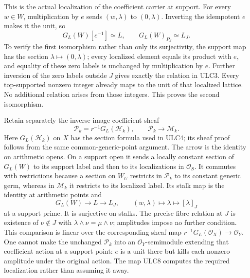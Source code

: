 \documentclass[11pt,a4paper]{article}
\theoremstyle{definition}\newtheorem{definition}[theorem]{Definition}
\begin{document}
This is the actual localization of the coefficient carrier at support.
For every $w\in W$, multiplication by $e$ sends $(w,\lambda)$ to
$(0,\lambda)$. Inverting the idempotent $e$ makes it the unit, so
\begin{equation}\tag{ULC6}
 G_L(W)[e^{-1}]\simeq L,
 \qquad G_L(W)_{P_J}\simeq L_J.
\end{equation}
To verify the first isomorphism rather than only its surjectivity,
the support map has the section $\lambda\mapsto(0,\lambda)$;
every localized element equals its product with $e$, and equality
of these zero labels is unchanged by multiplication by $e$.
Further inversion of the zero labels outside $J$ gives exactly
the relation in ULC3. Every top-supported nonzero integer already
maps to the unit of that localized lattice. No additional relation
arises from those integers. This proves the second isomorphism.

Retain separately the inverse-image coefficient sheaf
\begin{equation}\tag{ULC7}
 \mathcal P_k=r^{-1}G_L(\mathcal H_k),\qquad
 \mathcal P_k\longrightarrow\mathcal M_k.
\end{equation}
Here $G_L(\mathcal H_k)$ on $X$ has the section formula used in
ULC4; its sheaf proof follows from the same common-generic-point
argument. The arrow is the identity on arithmetic opens. On a support
open it sends a locally constant section of $G_L(W)$ to its support
label and then to its localizations in $\mathcal O_S$.
It commutes with restrictions because a section on $W_U$ restricts
in $\mathcal P_k$ to its constant generic germ, whereas in
$\mathcal M_k$ it restricts to its localized label. Its stalk map is
the identity at arithmetic points and
\begin{equation}\tag{ULC8}
 G_L(W)\longrightarrow L\longrightarrow L_J,
 \qquad (w,\lambda)\longmapsto\lambda\longmapsto[\lambda]_J
\end{equation}
at a support prime. It is surjective on stalks. The precise fibre
relation at $J$ is existence of $\nu\notin J$ with
$\lambda\wedge\nu=\mu\wedge\nu$; amplitudes impose no further
condition. This comparison is linear over the corresponding sheaf
map $r^{-1}G_L(\mathcal O_X)\to\mathcal O_Y$.
One cannot make the unchanged $\mathcal P_k$ into an
$\mathcal O_Y$-semimodule extending that coefficient action at a
support point: $e$ is a unit there but kills each nonzero amplitude
under the original action. The map ULC8 computes the required
localization rather than assuming it away.
\end{document}
